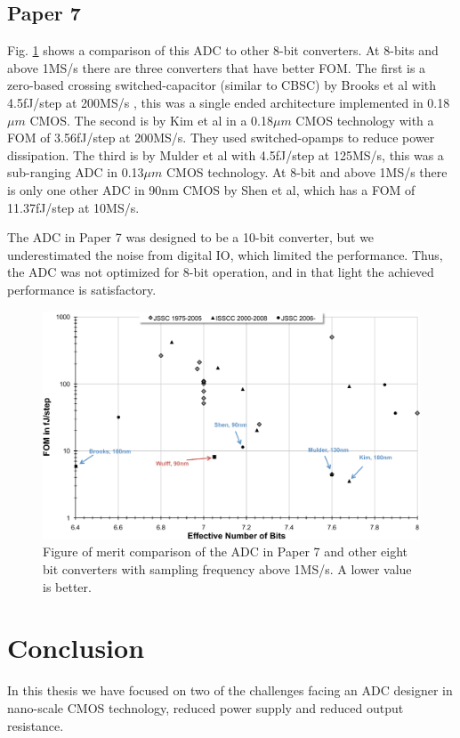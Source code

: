 \subsection{Paper 7}
Fig. \ref{fig:adccomp} shows a
comparison of this ADC to other 8-bit converters. At 8-bits and above
1MS/s there are three converters that have 
better FOM. The first is a zero-based
crossing switched-capacitor (similar to CBSC) by Brooks et al with
4.5fJ/step at 200MS/s
\cite{brooks07a}, this was a single ended architecture implemented in
0.18$\mu m$
CMOS. The second is by Kim et al \cite{kim05}  in a 0.18$\mu m$ CMOS
technology with a FOM of
3.56fJ/step at 200MS/s. They used switched-opamps to reduce power dissipation.
The third
is by Mulder et al \cite{mulder04} with 4.5fJ/step at 125MS/s, this was a
sub-ranging ADC in 0.13$\mu m$ CMOS technology. At 8-bit and above
1MS/s there is only one other ADC in 90nm CMOS by Shen et
al\cite{shen08}, which has a FOM of 11.37fJ/step at 10MS/s.

The ADC in Paper 7 was designed to be a 10-bit converter, but we
underestimated the noise from digital IO, which limited the
performance. Thus, the ADC was not optimized for 8-bit operation, and
in that light the achieved performance is satisfactory.


\begin{figure}[htb]
\centering 
 \includegraphics[width=\myfigwidth]{graphics/adccomp}
  \caption{Figure of merit comparison of the ADC in Paper 7 and other
    eight bit converters with sampling frequency above 1MS/s. A lower
    value is better.}
  \label{fig:adccomp}
\end{figure}

\section{Conclusion}
In this thesis we have focused on two of the challenges facing an ADC
designer in nano-scale CMOS technology, reduced power supply  and reduced
output resistance. 

